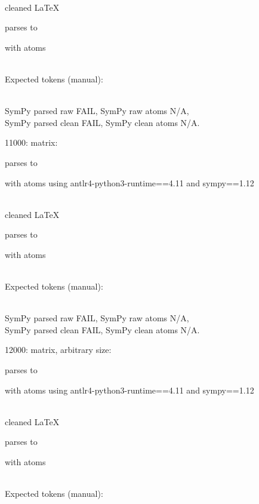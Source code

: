 \documentclass{article}
\begin{document}
\ \\
cleaned \LaTeX

parses to

with atoms


\ \\
Expected tokens (manual):


\ \\
SymPy parsed raw FAIL, 
SymPy raw atoms N/A, \\
SymPy parsed clean FAIL, 
SymPy clean atoms N/A.

\hrulefill

11000:
matrix:

parses to

with atoms
using antlr4-python3-runtime==4.11 and sympy==1.12

\ \\
cleaned \LaTeX

parses to

with atoms


\ \\
Expected tokens (manual):



\ \\
SymPy parsed raw FAIL, 
SymPy raw atoms N/A, \\
SymPy parsed clean FAIL, 
SymPy clean atoms N/A.

\hrulefill

12000:
matrix, arbitrary size:

parses to

with atoms
using antlr4-python3-runtime==4.11 and sympy==1.12

\ \\
cleaned \LaTeX

parses to

with atoms


\ \\
Expected tokens (manual):

\end{document}
